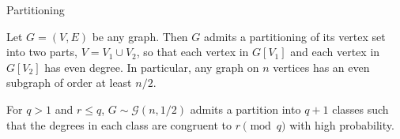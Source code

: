 \documentclass{beamer}
\theoremstyle{plain}
\newtheorem{conjecture}[theorem]{Conjecture}
\begin{document}




	\begin{frame}{Partitioning}
			\begin{theorem}
				Let $G = (V, E)$ be any graph.
				Then $G$ admits a partitioning of its vertex set into two parts, $V = V_1 \cup V_2$, so that each vertex in $G[V_1]$ and each vertex in $G[V_2]$ has even degree.
				In particular, any graph on $n$ vertices has an even subgraph of order at least $n/2$.
			\end{theorem}\pause

			\begin{theorem}
				For $q>1$ and $r\leq q$, $G\sim \mathcal{G}(n, 1/2)$ admits a partition into $q+1$ classes such that the degrees in each class are congruent to $r\pmod q$ with high probability.
			\end{theorem}

	\end{frame}






\end{document}
